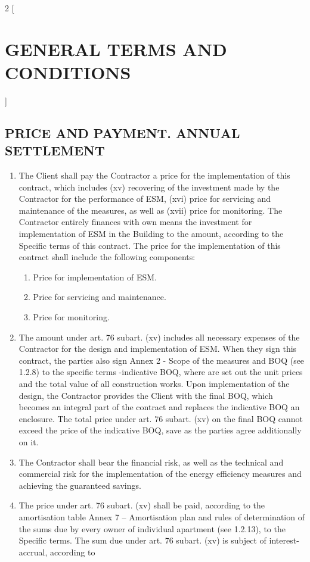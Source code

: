 \begin{multicols}{2} [\section{GENERAL TERMS AND CONDITIONS}]
  \subsection{PRICE AND PAYMENT. ANNUAL SETTLEMENT}
  \begin{enumerate}
  \item The Client shall pay the Contractor a price for the
    implementation of this contract, which includes (xv) recovering of
    the investment made by the Contractor for the performance of ESM,
    (xvi) price for servicing and maintenance of the measures, as well
    as (xvii) price for monitoring. The Contractor entirely finances
    with own means the investment for implementation of ESM in the
    Building to the amount, according to the Specific terms of this
    contract.  The price for the implementation of this contract shall
    include the following components:
    \begin{enumerate}
    \item Price for implementation of ESM.
    \item Price for servicing and maintenance.
    \item Price for monitoring.
    \end{enumerate}
  \item The amount under art. 76 subart. (xv) includes all necessary
    expenses of the Contractor for the design and implementation of
    ESM. When they sign this contract, the parties also sign Annex 2 {-}
    Scope of the measures and BOQ (see 1.2.8) to the specific terms
    -indicative BOQ, where are set out the unit prices and the total
    value of all construction works. Upon implementation of the
    design, the Contractor provides the Client with the final BOQ,
    which becomes an integral part of the contract and replaces the
    indicative BOQ an enclosure. The total price under art.  76
    subart. (xv) on the final BOQ cannot exceed the price of the
    indicative BOQ, save as the parties agree additionally on it.
  \item The Contractor shall bear the financial risk, as well as the
    technical and commercial risk for the implementation of the energy
    efficiency measures and achieving the guaranteed savings.
  \item The price under art. 76 subart. (xv) shall be paid, according
    to the amortisation table Annex 7 – Amortisation plan and rules of
    determination of the sums due by every owner of individual
    apartment (see 1.2.13), to the Specific terms. The sum due under
    art. 76 subart. (xv) is subject of interest-accrual, according to

\end{enumerate}
\end{multicols}
